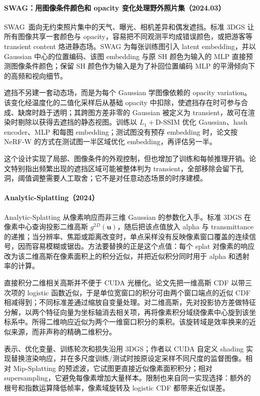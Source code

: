 \paragraph{SWAG：用图像条件颜色和 opacity 变化处理野外照片集（2024.03）}
SWAG~\cite{2403_10427}面向无约束照片集中的天气、曝光、相机差异和偶发遮挡。标准 3DGS 让所有图像共享一套颜色与 opacity，容易把不同观测平均成错误颜色，或把游客等 transient content 烙进静态场。SWAG 为每张训练图引入 latent embedding，并以 Gaussian 中心的位置编码、该图 embedding 与原 SH 颜色为输入的 MLP 直接预测图像条件颜色；保留 SH 颜色作为输入是为了补回位置编码 MLP 的平滑倾向下的高频和视向细节。

遮挡不另建一套动态场，而是为每个 Gaussian 学图像依赖的 opacity variation。该变化经温度化的二值化采样后从基础 opacity 中扣除，使遮挡存在时可参与合成、缺席时趋于透明；其跨图方差非零的 Gaussian 被定义为 transient，故可在渲染时剔除以获得去遮挡的静态视图。训练以 $L_1+$D-SSIM 优化 Gaussian、hash encoder、MLP 和每图 embedding；测试图没有预存 embedding 时，论文按 NeRF-W 的方式在测试图一半区域优化 embedding，再评估另一半。

这个设计实现了局部、图像条件的外观控制，但也增加了训练和每帧推理开销。论文特别指出频繁出现的遮挡区域可能被整体判为 transient，全部移除会留下孔洞，阈值调整需要人工取舍；它不是对任意动态场景的时序建模。


\paragraph{Analytic-Splatting（2024）\cite{2403_11056}}
Analytic-Splatting 从像素响应而非三维 Gaussian 的参数化入手。标准 3DGS 在像素中心查询投影二维高斯 $g^{2D}(\mathbf u)$，随后把该点值放入 alpha 与 transmittance 的递推；当分辨率、焦距或距离改变时，单点采样没有反映像素窗口覆盖的连续信号，因而容易模糊或锯齿。方法要替换的正是这个点值：每个 splat 对像素的响应改为该二维高斯在像素面积上的积分近似，并把近似积分同时用于 alpha 和透射率的计算。

直接积分二维相关高斯并不便于 CUDA 光栅化。论文先把一维高斯 CDF 以带三次项的 logistic 函数近似，于是单位宽窗口的积分可由两个窗口端点的近似 CDF 相减得到；不同标准差通过缩放自变量处理。对二维高斯，先对投影协方差做特征分解，以两个特征向量为坐标轴消去相关项，再将像素积分域绕像素中心旋到该坐标系中。所得二维响应近似为两个一维窗口积分的乘积。该旋转域是效率换来的近似来源，而非声称的精确二维积分。

表示、优化变量、训练轮次和损失沿用 3DGS；作者以 CUDA 自定义 shading 实现替换渲染响应，并在多尺度训练/测试时按原设定采样不同尺度的监督图像。相对 Mip-Splatting 的预滤波，它试图更直接近似像素面积积分；相对 supersampling，它避免每像素增加大量样本。限制也来自同一实现选择：额外的根号和指数运算降低帧率，像素域旋转及 logistic CDF 都带来近似误差。

